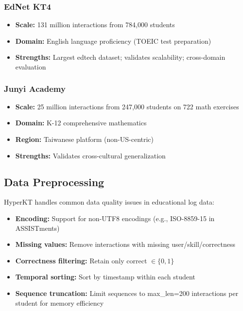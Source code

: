 \documentclass[10pt,twocolumn]{article}
\begin{document}
\subsubsection{EdNet KT4}
\begin{itemize}
  \item \textbf{Scale:} 131 million interactions from 784,000 students
  \item \textbf{Domain:} English language proficiency (TOEIC test preparation)
  \item \textbf{Strengths:} Largest edtech dataset; validates scalability; cross-domain evaluation
\end{itemize}

\subsubsection{Junyi Academy}
\begin{itemize}
  \item \textbf{Scale:} 25 million interactions from 247,000 students on 722 math exercises
  \item \textbf{Domain:} K-12 comprehensive mathematics
  \item \textbf{Region:} Taiwanese platform (non-US-centric)
  \item \textbf{Strengths:} Validates cross-cultural generalization
\end{itemize}

\subsection{Data Preprocessing}

HyperKT handles common data quality issues in educational log data:

\begin{itemize}
  \item \textbf{Encoding:} Support for non-UTF8 encodings (e.g., ISO-8859-15 in ASSISTments)
  \item \textbf{Missing values:} Remove interactions with missing user/skill/correctness
  \item \textbf{Correctness filtering:} Retain only correct $\in \{0, 1\}$
  \item \textbf{Temporal sorting:} Sort by timestamp within each student
  \item \textbf{Sequence truncation:} Limit sequences to max\_len=200 interactions per student for memory efficiency
\end{itemize}
\end{document}
